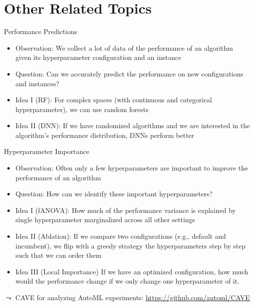 \section{Other Related Topics}
\begin{frame}[c]{Performance Predictions}

\begin{itemize}
	\item \alert{Observation}: We collect a lot of data of the performance of an algorithm given its hyperparameter configuration and an instance
	\smallskip
	\pause
	\item \alert{Question}: Can we accurately predict the performance on new configurations and instances?
	\smallskip
	\pause
	\item \alert{Idea I (RF)}: For complex spaces (with continuous and categorical hyperparameter), we can use random forests  
	\smallskip
	\pause
	\item \alert{Idea II (DNN)}: If we have randomized algorithms and we are interested in the algorithm's performance distribution, DNNs perform better 
\end{itemize}

\end{frame}
\begin{frame}[c]{Hyperparameter Importance}

\begin{itemize}
	\item \alert{Observation}: Often only a few hyperparameters are important to improve the performance of an algorithm
	\smallskip
	\pause
	\item \alert{Question}: How can we identify these important hyperparameters?
	\smallskip
	\pause
	\item \alert{Idea I (fANOVA)}: How much of the performance variance is explained by single hyperparameter marginalized across all other settings
	\smallskip
	\pause
	\item \alert{Idea II (Ablation)}: If we compare two configurations (e.g., default and incumbent), we flip with a greedy strategy the hyperparameters step by step such that we can order them
	\smallskip
	\pause
	\item  \alert{Idea III (Local Importance)} If we have an optimized configuration, how much would the performance change if we only change one hyperparameter of it.
\end{itemize}


$\leadsto$ CAVE for analyzing AutoML experiments: \url{https://github.com/automl/CAVE}
\end{frame}
